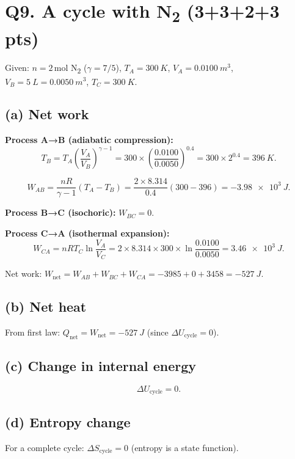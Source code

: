 \documentclass[11pt]{article}
\newcommand{\ans}[1]{\boxed{\displaystyle #1}}
\begin{document}
\section*{Q9. A cycle with N\textsubscript{2} (3+3+2+3 pts)}

Given: \(n = 2\,\text{mol}\) N\textsubscript{2} (\(\gamma = 7/5\)),
\(T_A = \SI{300}{K}\),
\(V_A = \SI{0.0100}{m^3}\),
\(V_B = \SI{5}{L} = \SI{0.0050}{m^3}\),
\(T_C = \SI{300}{K}\).

\subsection*{(a) Net work}
\textbf{Process A→B (adiabatic compression):}
\[
T_B = T_A \left(\frac{V_A}{V_B}\right)^{\gamma-1}
= 300 \times \left(\frac{0.0100}{0.0050}\right)^{0.4}
= 300 \times 2^{0.4} = \SI{396}{K}.
\]

\[
W_{AB} = \frac{nR}{\gamma-1}(T_A - T_B)
= \frac{2 \times 8.314}{0.4}(300 - 396)
= \ans{\SI{-3.98e3}{J}}.
\]

\textbf{Process B→C (isochoric):} \(W_{BC} = 0\).

\textbf{Process C→A (isothermal expansion):}
\[
W_{CA} = nRT_C \ln\frac{V_A}{V_C}
= 2 \times 8.314 \times 300 \times \ln\frac{0.0100}{0.0050}
= \ans{\SI{3.46e3}{J}}.
\]

Net work: \(W_{\text{net}} = W_{AB} + W_{BC} + W_{CA} = -3985 + 0 + 3458 = \ans{\SI{-527}{J}}\).

\subsection*{(b) Net heat}
From first law: \(Q_{\text{net}} = W_{\text{net}} = \ans{\SI{-527}{J}}\) (since \(\Delta U_{\text{cycle}} = 0\)).

\subsection*{(c) Change in internal energy}
\[
\Delta U_{\text{cycle}} = \ans{0}.
\]

\subsection*{(d) Entropy change}
For a complete cycle: \(\Delta S_{\text{cycle}} = \ans{0}\) (entropy is a state function).
\end{document}
